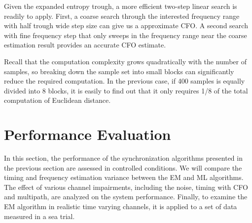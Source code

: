 \documentclass[journal,comsoc]{IEEEtran}
\begin{document}
Given the expanded entropy trough, a more efficient two-step linear search is readily to apply.
First, a coarse search through the interested frequency range with half trough wide step size can give us a approximate CFO.
A second search with fine frequency step that only sweeps in the frequency range near the coarse estimation result provides an accurate CFO estimate.

Recall that the computation complexity grows quadratically with the number of samples, so breaking down the sample set into small blocks can significantly reduce the required computation.
In the previous case, if 400 samples is equally divided into 8 blocks, it is easily to find out that it only requires 1/8 of the total computation of Euclidean distance. 




\section{Performance Evaluation}
\label{sec:perfo}
In this section, the performance of the synchronization algorithms presented in the previous section are assessed in controlled conditions.
We will compare the timing and frequency estimation variance between the EM and ML algorithms.
The effect of various channel impairments, including the noise, timing with CFO and multipath, are analyzed on the system performance.
Finally, to examine the EM algorithm in realistic time varying channels, it is applied to a set of data measured in a sea trial.
\end{document}
